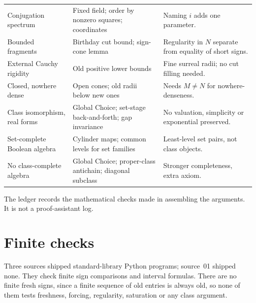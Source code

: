 \documentclass[11pt,letterpaper]{article}
\numberwithin{equation}{section}
\theoremstyle{definition}
\theoremstyle{remark}
\begin{document}
{\begin{longtable}{@{}P{0.27\textwidth}P{0.36\textwidth}P{0.29\textwidth}@{}}
Conjugation spectrum & Fixed field; order by nonzero squares; coordinates & Naming $i$ adds one parameter.\\[3pt]
Bounded fragments & Birthday cut bound; sign-cone lemma & Regularity in $N$ separate from equality of short signs.\\[3pt]
External Cauchy rigidity & Old positive lower bounds & Fine surreal radii; no cut filling needed.\\[3pt]
Closed, nowhere dense & Open cones; old radii below new ones & Needs $M\ne N$ for nowhere-denseness.\\[3pt]
Class isomorphism, real forms & Global Choice; set-stage back-and-forth; gap invariance & No valuation, simplicity or exponential preserved.\\[3pt]
Set-complete Boolean algebra & Cylinder maps; common levels for set families & Least-level set pairs, not class objects.\\[3pt]
No class-complete algebra & Global Choice; proper-class antichain; diagonal subclass & Stronger completeness, extra axiom.\\
\bottomrule
\end{longtable}}

The ledger records the mathematical checks made in assembling the arguments. It
is not a proof-assistant log.

\section{Finite checks}\label{univ:app:checks}

Three sources shipped standard-library Python programs; source~01 shipped none.
They check finite sign comparisons and interval formulas. There are no finite
fresh signs, since a finite sequence of old entries is always old, so none of
them tests freshness, forcing, regularity, saturation or any class argument.
\end{document}
